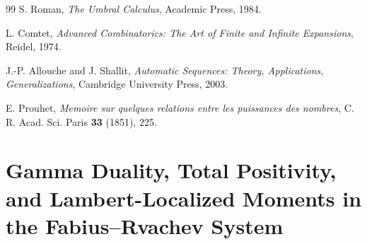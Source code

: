 \documentclass[11pt]{article}
\makeatletter
\renewcommand{\headrulewidth}{0.3pt}
\numberwithin{equation}{section}
\let\frontier@normal@H@refstepcounter\H@refstepcounter
\let\frontier@normal@Hy@chapapp\Hy@chapapp
\newcommand{\frontierreportpart}[1]{%
  \clearpage
  \let\H@refstepcounter\frontier@normal@H@refstepcounter
  \let\Hy@chapapp\frontier@normal@Hy@chapapp
  \gdef\theHsection{\arabic{part}.\arabic{section}}%
  \setcounter{section}{0}%
  \renewcommand{\thesection}{\arabic{section}}%
  \part{#1}}
\theoremstyle{definition}
\theoremstyle{remark}
\makeatother
\begin{document}
\begin{thebibliography}{99}
S. Roman,
\emph{The Umbral Calculus},
Academic Press, 1984.

L. Comtet,
\emph{Advanced Combinatorics: The Art of Finite and Infinite Expansions},
Reidel, 1974.

J.-P. Allouche and J. Shallit,
\emph{Automatic Sequences: Theory, Applications, Generalizations},
Cambridge University Press, 2003.

E. Prouhet,
\emph{Memoire sur quelques relations entre les puissances des nombres},
C. R. Acad. Sci. Paris \textbf{33} (1851), 225.

\end{thebibliography}


\renewcommand{\headrulewidth}{0.4pt}
\newcommand{\VarPartii}{\Variance}
\newcommand{\CovPartii}{\Covariance}
\newcommand{\suppPartii}{\SupportOperator}
\newcommand{\sgnPartii}{\Sign}
\newcommand{\diagPartii}{\DiagonalOperator}
\newcommand{\Cum}{\operatorname{Cum}}
\newcommand{\repoPartii}{\nolinkurl{Analysis/FabiusFunction}}
\newcommand{\statusproved}{\textcolor{provedgreen}{\textbf{proved here}}}
\newcommand{\statusfrontier}{\textcolor{cautionorange}{\textbf{frontier proposal}}}

\frontierreportpart{Gamma Duality, Total Positivity, and Lambert-Localized
Moments in the Fabius--Rvachev System}
\end{document}
